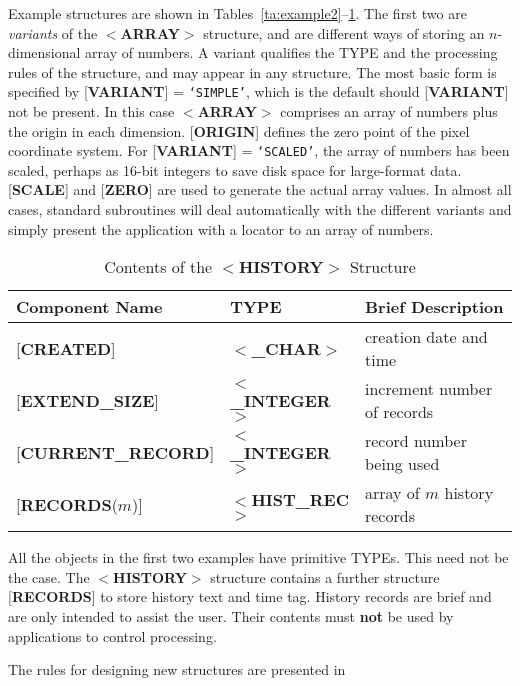 \documentclass[twoside,11pt,nolof,noabs]{starlink}
\begin{document}
Example structures are shown in
Tables~\ref{ta:example2}--\ref{ta:example4}.
The first two are \textit{variants} of the $<$\textbf{ARRAY}$>$
structure, and are different ways of storing an $n$-dimensional array of
numbers.  A variant qualifies the TYPE and the processing rules of the
structure, and may appear in any structure.  The most basic form is
specified by
{[}\textbf{VARIANT}{]} = \texttt{`SIMPLE'}, which is the default should
{[}\textbf{VARIANT}{]} not be
present. In this case $<$\textbf{ARRAY}$>$ comprises an
array of numbers plus the origin in each
dimension. {[}\textbf{ORIGIN}{]} defines the zero point of the
pixel coordinate system. For {[}\textbf{VARIANT}{]} = \texttt{`SCALED'},
the array of numbers has been
scaled, perhaps as 16-bit integers to save disk space for large-format
data.  {[}\textbf{SCALE}{]} and {[}\textbf{ZERO}{]} are used to generate the
actual array values.
In almost all cases, standard subroutines will deal automatically
with the different variants and
simply present the application with a locator to an array of numbers.

\begin{table}
\centering
\caption{Contents of the $<$\textbf{HISTORY}$>$ Structure}
\label{ta:example4}
\begin{tabular}{|l|l|l|}
\hline
Component Name & TYPE & Brief Description \\ \hline
{[}\textbf{CREATED}{]} & $<$\textbf{\_CHAR}$>$ & creation date and time \\
{[}\textbf{EXTEND\_SIZE}{]} & $<$\textbf{\_INTEGER}$>$ & increment number of records \\
{[}\textbf{CURRENT\_RECORD}{]} & $<$\textbf{\_INTEGER}$>$ & record number being used \\
{[}\textbf{RECORDS}($m$){]} & $<$\textbf{HIST\_REC}$>$ & array of $m$ history records \\ \hline
\end{tabular}
\end{table}

All the objects in the first two examples have primitive TYPEs.  This
need not be the case.  The $<$\textbf{HISTORY}$>$ structure contains a further
structure {[}\textbf{RECORDS}{]} to store history text and time tag. History
records are brief and are only intended to assist the user.  Their
contents must \textbf{not} be used by applications to
control processing.

The rules for designing new structures are presented
in 
\end{document}
